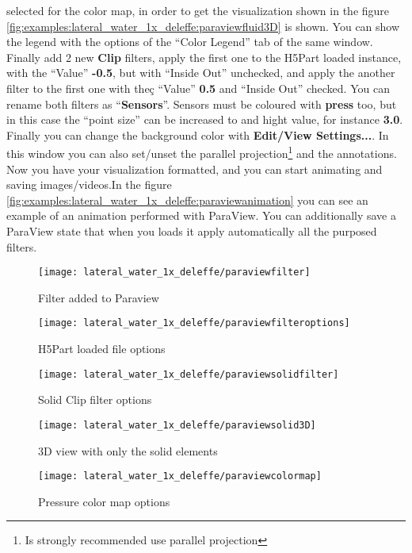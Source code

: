 selected for the color map, in order to get the visualization shown in the figure
\ref{fig:examples:lateral_water_1x_deleffe:paraviewfluid3D} is shown. You can show the legend with the options
of the ``Color Legend'' tab of the same window.\rc
%
Finally add 2 new \textbf{Clip} filters, apply the first one to the H5Part loaded instance, with the ``Value''
\textbf{-0.5}, but with ``Inside Out'' unchecked, and apply the another filter to the first one with theç
``Value'' \textbf{0.5} and ``Inside Out'' checked. You can rename both filters as ``\textbf{Sensors}''.\rc
%
Sensors must be coloured with \textbf{press} too, but in this case the ``point size'' can be increased to and
hight value, for instance \textbf{3.0}.\rc
%
Finally you can change the background color with \textbf{Edit/View Settings...}. In this window you can also
set/unset the parallel projection\footnote{Is strongly recommended use parallel projection} and the
annotations.\rc
%
Now you have your visualization formatted, and you can start animating and saving images/videos.In the figure
\ref{fig:examples:lateral_water_1x_deleffe:paraviewanimation} you can see an example of an animation performed
with ParaView.\rc
%
You can additionally save a ParaView state that when you loads it apply automatically all the purposed filters.
%
\begin{figure}[ht!]
  \centering
  \texttt{[image: lateral\_water\_1x\_deleffe/paraviewfilter]}
  \caption{Filter added to Paraview}
  \label{fig:examples:lateral_water_1x_deleffe:paraviewfilter}
\end{figure}
%
\begin{figure}[ht!]
  \centering
  \texttt{[image: lateral\_water\_1x\_deleffe/paraviewfilteroptions]}
  \caption{H5Part loaded file options}
  \label{fig:examples:lateral_water_1x_deleffe:paraviewfilteroptions}
\end{figure}
%
\begin{figure}[ht!]
  \centering
  \texttt{[image: lateral\_water\_1x\_deleffe/paraviewsolidfilter]}
  \caption{Solid Clip filter options}
  \label{fig:examples:lateral_water_1x_deleffe:paraviewsolidfilter}
\end{figure}
%
\begin{figure}[ht!]
  \centering
  \texttt{[image: lateral\_water\_1x\_deleffe/paraviewsolid3D]}
  \caption{3D view with only the solid elements}
  \label{fig:examples:lateral_water_1x_deleffe:paraviewsolid3D}
\end{figure}
%
\begin{figure}[ht!]
  \centering
  \texttt{[image: lateral\_water\_1x\_deleffe/paraviewcolormap]}
  \caption{Pressure color map options}
  \label{fig:examples:lateral_water_1x_deleffe:paraviewcolormap}
\end{figure}
